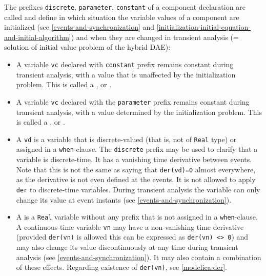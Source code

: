 The prefixes \lstinline!discrete!, \lstinline!parameter!, \lstinline!constant! of a component declaration are called  and define in which situation the variable values of a component are initialized (see \cref{events-and-synchronization} and \cref{initialization-initial-equation-and-initial-algorithm}) and when they are changed in transient analysis (= solution of initial value problem of the hybrid DAE):
\begin{itemize}
\item
  A variable \lstinline!vc! declared with \lstinline!constant! prefix remains constant during transient analysis, with a value that is unaffected by the initialization problem.
  This is called a , or .
\item
  A variable \lstinline!vc! declared with the \lstinline!parameter! prefix remains constant during transient analysis, with a value determined by the initialization problem.
  This is called a , or .
\item
  A  \lstinline!vd! is a variable that is discrete-valued (that is, not of \lstinline!Real! type) or assigned in a \lstinline!when!-clause.
  The \lstinline!discrete! prefix may be used to clarify that a variable is discrete-time.
  It has a vanishing time derivative between events.
  Note that this is not the same as saying that \lstinline!der(vd)=0! almost everywhere, as the derivative is not even defined at the events.
  It is not allowed to apply \lstinline!der! to discrete-time variables.
  During transient analysis the variable can only change its value at event instants (see \cref{events-and-synchronization}).
\item
  A  is a \lstinline!Real! variable without any prefix that is not assigned in a \lstinline!when!-clause.
  A continuous-time variable \lstinline!vn! may have a non-vanishing time derivative (provided \lstinline!der(vn)! is allowed this can be expressed as \lstinline!der(vn) <> 0!) and may also change its value discontinuously at any time during transient analysis (see \cref{events-and-synchronization}).
  It may also contain a combination of these effects.
  Regarding existence of \lstinline!der(vn)!, see \cref{modelica:der}.
\end{itemize}

